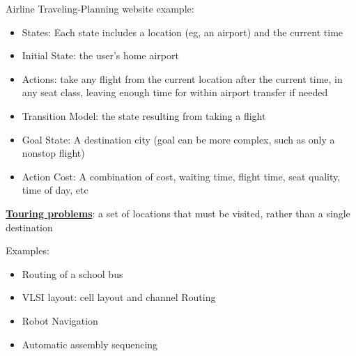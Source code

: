 \documentclass[12pt]{article}
\newcommand{\definition}[1]{\underline{\textbf{#1}}}
\begin{document}
Airline Traveling-Planning website example:
\begin{itemize}
    \item States: Each state includes a location (eg, an airport) and the current time
    \item Initial State: the user's home airport
    \item Actions: take any flight from the current location after the current time, in any seat class, leaving enough time for within airport transfer if needed
    \item Transition Model: the state resulting from taking a flight
    \item Goal State: A destination city (goal can be more complex, such as only a nonstop flight)
    \item Action Cost: A combination of cost, waiting time, flight time, seat quality, time of day, etc
\end{itemize}

\definition{Touring problems}: a set of locations that must be visited, rather than a single destination

Examples:
\begin{itemize}
    \item Routing of a school bus
    \item VLSI layout: cell layout and channel Routing
    \item Robot Navigation
    \item Automatic assembly sequencing
\end{itemize}
\end{document}

